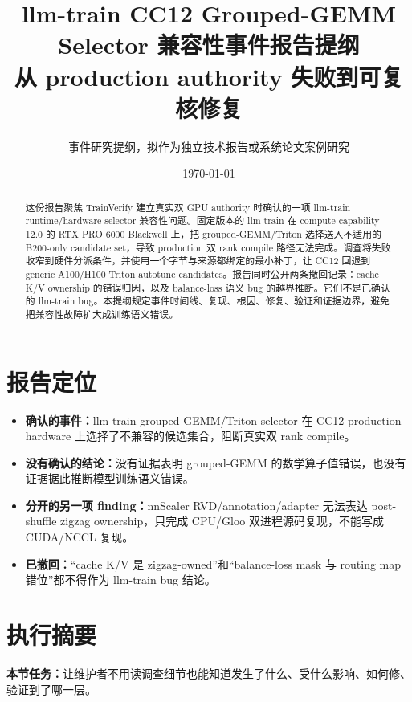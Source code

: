\documentclass[11pt,a4paper]{ctexart}
\title{llm-train CC12 Grouped-GEMM Selector 兼容性事件报告提纲\\\large 从 production authority 失败到可复核修复}
\author{事件研究提纲，拟作为独立技术报告或系统论文案例研究}
\date{\today}
\newcommand{\contract}[1]{\par\smallskip\noindent\colorbox{light}{\parbox{0.95\linewidth}{\textbf{本节任务：}#1}}\par\smallskip}
\begin{document}
\maketitle

\begin{abstract}
这份报告聚焦 TrainVerify 建立真实双 GPU authority 时确认的一项 llm-train runtime/hardware selector 兼容性问题。固定版本的 llm-train 在 compute capability 12.0 的 RTX PRO 6000 Blackwell 上，把 grouped-GEMM/Triton 选择送入不适用的 B200-only candidate set，导致 production 双 rank compile 路径无法完成。调查将失败收窄到硬件分派条件，并使用一个字节与来源都绑定的最小补丁，让 CC12 回退到 generic A100/H100 Triton autotune candidates。报告同时公开两条撤回记录：cache K/V ownership 的错误归因，以及 balance-loss 语义 bug 的越界推断。它们不是已确认的 llm-train bug。本提纲规定事件时间线、复现、根因、修复、验证和证据边界，避免把兼容性故障扩大成训练语义错误。
\end{abstract}

\section*{报告定位}

\begin{itemize}
  \item \textbf{确认的事件：}llm-train grouped-GEMM/Triton selector 在 CC12 production hardware 上选择了不兼容的候选集合，阻断真实双 rank compile。
  \item \textbf{没有确认的结论：}没有证据表明 grouped-GEMM 的数学算子值错误，也没有证据据此推断模型训练语义错误。
  \item \textbf{分开的另一项 finding：}nnScaler RVD/annotation/adapter 无法表达 post-shuffle zigzag ownership，只完成 CPU/Gloo 双进程源码复现，不能写成 CUDA/NCCL 复现。
  \item \textbf{已撤回：}“cache K/V 是 zigzag-owned”和“balance-loss mask 与 routing map 错位”都不得作为 llm-train bug 结论。
\end{itemize}

\section{执行摘要}
\contract{让维护者不用读调查细节也能知道发生了什么、受什么影响、如何修、验证到了哪一层。}
\end{document}
